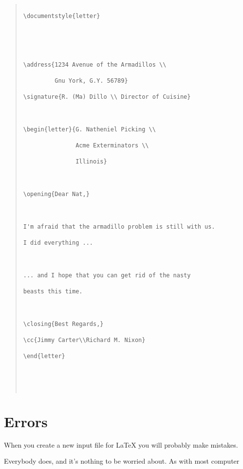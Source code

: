 \begin{quote}\footnotesize\begin{verbatim}

\documentstyle{letter}





\address{1234 Avenue of the Armadillos \\

         Gnu York, G.Y. 56789}

\signature{R. (Ma) Dillo \\ Director of Cuisine}



\begin{letter}{G. Natheniel Picking \\

               Acme Exterminators \\

               Illinois}



\opening{Dear Nat,}



I'm afraid that the armadillo problem is still with us.

I did everything ...



... and I hope that you can get rid of the nasty

beasts this time.



\closing{Best Regards,}

\cc{Jimmy Carter\\Richard M. Nixon}

\end{letter}





\end{verbatim}\end{quote}



\section{Errors}



When you create a new input file for \LaTeX{} you will probably make mistakes.

Everybody does, and it's nothing to be worried about.  As with most computer

